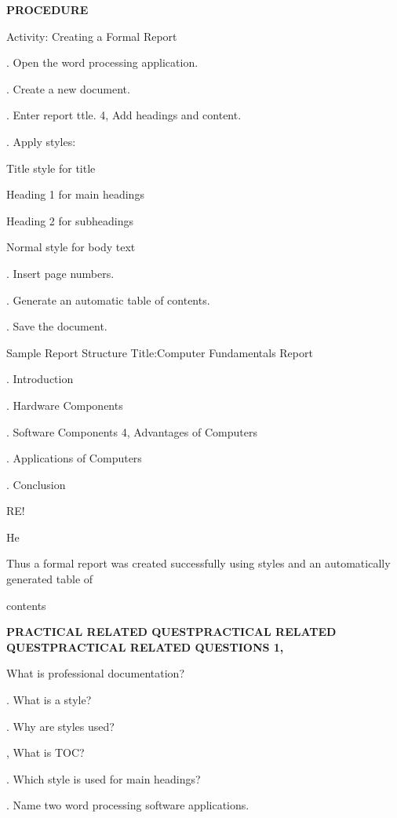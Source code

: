 \documentclass[10pt,a4paper]{article}
\begin{document}
\medskip\noindent\textbf{PROCEDURE}\par
\noindent Activity: Creating a Formal Report\par
{}. Open the word processing application.\par
{}. Create a new document.\par
{}. Enter report ttle. 4, Add headings and content.\par
{}. Apply styles:\par
\noindent\textbullet\; Title style for title\par
\noindent\textbullet\; Heading 1 for main headings\par
\clearpage
\noindent\textbullet\; Heading 2 for subheadings\par
\noindent\textbullet\; Normal style for body text\par
{}. Insert page numbers.\par
{}. Generate an automatic table of contents.\par
{}. Save the document.\par
\noindent Sample Report Structure Title:Computer Fundamentals Report\par
{}. Introduction\par
{}. Hardware Components\par
{}. Software Components 4, Advantages of Computers\par
{}. Applications of Computers\par
{}. Conclusion\par
\noindent RE!\par
\noindent He\par
\noindent Thus a formal report was created successfully using styles and an automatically generated table of\par
\noindent contents\par
\medskip\noindent\textbf{PRACTICAL RELATED QUESTPRACTICAL RELATED QUESTPRACTICAL RELATED QUESTIONS 1,}\par
\noindent What is professional documentation?\par
{}. What is a style?\par
{}. Why are styles used?\par
{}, What is TOC?\par
{}. Which style is used for main headings?\par
{}. Name two word processing software applications.\par
\end{document}
